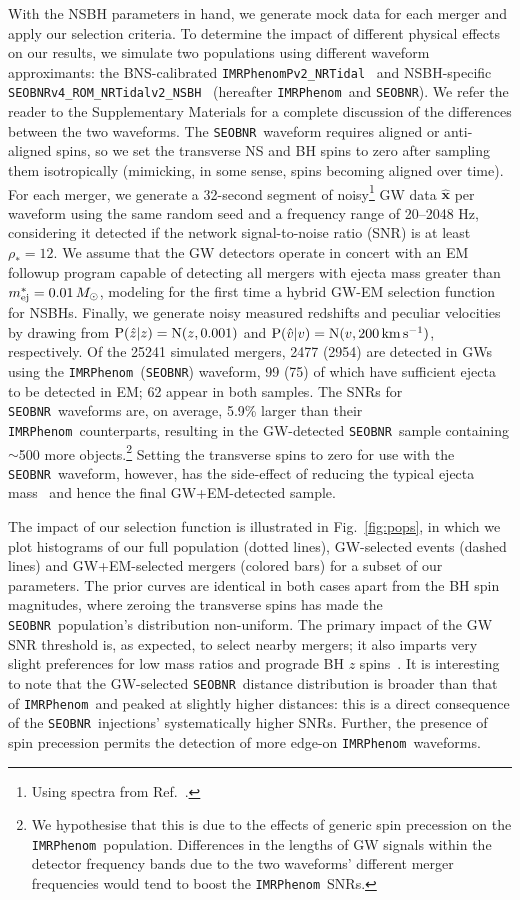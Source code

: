 \documentclass[%
 reprint,
 superscriptaddress,
 nofootinbib,
 amsmath,amssymb,
 aps,
]{revtex4-2}
\newcommand{\vobs}{\ensuremath{\hat{v}}}
\newcommand{\zobs}{\ensuremath{\hat{z}}}
\newcommand{\prob}{\ensuremath{{\rm P}}}
\newcommand{\normal}{{\rm{N}}}
\newcommand{\snrmin}{\rho_*}
\newcommand{\mejmin}{m_{\rm ej}^*}
\newcommand{\dgw}{\hat{\bm{x}}}
\newcommand{\kms}{\ensuremath{{\rm km\,s^{-1}}}}
\newcommand{\seobnr}{\texttt{SEOBNR}}
\newcommand{\seobnrfull}{\texttt{SEOBNRv4\_ROM\_NRTidalv2\_NSBH}}
\newcommand{\imrp}{\texttt{IMRPhenom}}
\newcommand{\imrpfull}{\texttt{IMRPhenomPv2\_NRTidal}}
\begin{document}
With the NSBH parameters in hand, we generate mock data for each merger and apply our selection criteria.  To determine the impact of different physical effects on our results, we simulate two populations using different waveform approximants: the BNS-calibrated \imrpfull~\cite{Dietrich_etal:2019} and NSBH-specific \seobnrfull~\cite{Matas_etal:2020} (hereafter \imrp\ and \seobnr). We refer the reader to the Supplementary Materials for a complete discussion of the differences between the two waveforms. The \seobnr\ waveform requires aligned or anti-aligned spins, so we set the transverse NS and BH spins to zero after sampling them isotropically (mimicking, in some sense, spins becoming aligned over time). For each merger, we generate a 32-second segment of noisy\footnote{Using spectra from Ref.~\cite{LVCnoise}.} GW data $\dgw$ per waveform using the same random seed and a frequency range of 20--2048 Hz, considering it detected if the network signal-to-noise ratio (SNR) is at least $\snrmin = 12$. We assume that the GW detectors operate in concert with an EM followup program capable of detecting all mergers with ejecta mass greater than $\mejmin = 0.01\,M_\odot$, modeling for the first time a hybrid GW-EM selection function for NSBHs. Finally, we generate noisy measured redshifts and peculiar velocities by drawing from $\prob(\zobs|z)=\normal(z,0.001)$ and $\prob(\vobs|v)=\normal(v,200\,\kms)$, respectively. Of the 25241 simulated mergers, 2477 (2954) are detected in GWs using the \imrp\ (\seobnr) waveform, 99 (75) of which have sufficient ejecta to be detected in EM; 62 appear in both samples. The SNRs for \seobnr\ waveforms are, on average, 5.9\% larger than their \imrp\ counterparts, resulting in the GW-detected \seobnr\ sample containing $\sim$500 more objects.\footnote{We hypothesise that this is due to the effects of generic spin precession on the \imrp\ population. Differences in the lengths of GW signals within the detector frequency bands due to the two waveforms' different merger frequencies would tend to boost the \imrp\ SNRs.}  Setting the transverse spins to zero for use with the \seobnr\ waveform, however, has the side-effect of reducing the typical ejecta mass~\cite{Foucart_etal:2018} and hence the final GW+EM-detected sample.

The impact of our selection function is illustrated in Fig.~\ref{fig:pops}, in which we plot histograms of our full population (dotted lines), GW-selected events (dashed lines) and GW+EM-selected mergers (colored bars) for a subset of our parameters. The prior curves are identical in both cases apart from the BH spin magnitudes, where zeroing the transverse spins has made the \seobnr\ population's distribution non-uniform. The primary impact of the GW SNR threshold is, as expected, to select nearby mergers; it also imparts very slight preferences for low mass ratios and prograde BH $z$ spins~\cite{Ng_etal:2018}. It is interesting to note that the GW-selected \seobnr\ distance distribution is broader than that of \imrp\ and peaked at slightly higher distances: this is a direct consequence of the \seobnr\ injections' systematically higher SNRs. Further, the presence of spin precession permits the detection of more edge-on \imrp\ waveforms.
\end{document}
